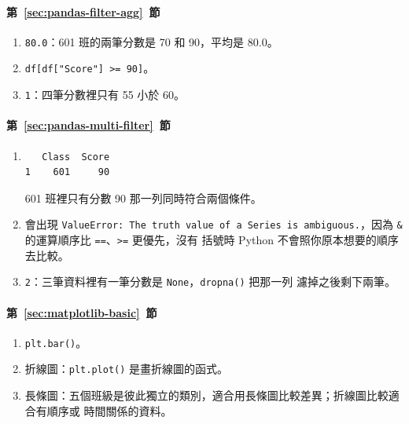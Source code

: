 \paragraph{第~\ref{sec:pandas-filter-agg}~節}
\begin{enumerate}
\item \texttt{80.0}：601 班的兩筆分數是 70 和 90，平均是 80.0。
\item \texttt{df[df["Score"] >= 90]}。
\item \texttt{1}：四筆分數裡只有 55 小於 60。
\end{enumerate}

\paragraph{第~\ref{sec:pandas-multi-filter}~節}
\begin{enumerate}
\item
\begin{verbatim}
   Class  Score
1    601     90
\end{verbatim}
601 班裡只有分數 90 那一列同時符合兩個條件。
\item 會出現 \texttt{ValueError: The truth value of a Series is
ambiguous.}，因為 \texttt{\&} 的運算順序比 \texttt{==}、\texttt{>=} 更優先，沒有
括號時 Python 不會照你原本想要的順序去比較。
\item \texttt{2}：三筆資料裡有一筆分數是 \texttt{None}，\texttt{dropna()} 把那一列
濾掉之後剩下兩筆。
\end{enumerate}

\paragraph{第~\ref{sec:matplotlib-basic}~節}
\begin{enumerate}
\item \texttt{plt.bar()}。
\item 折線圖：\texttt{plt.plot()} 是畫折線圖的函式。
\item 長條圖：五個班級是彼此獨立的類別，適合用長條圖比較差異；折線圖比較適合有順序或
時間關係的資料。
\end{enumerate}
